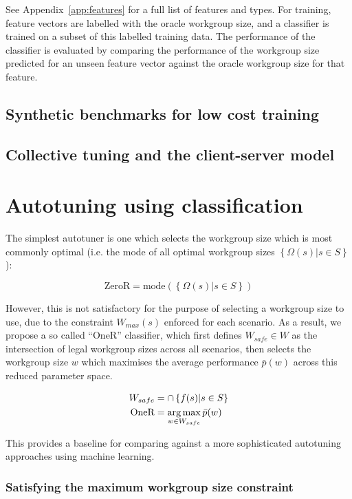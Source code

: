 See Appendix~\ref{app:features} for a full list of features and
types. For training, feature vectors are labelled with the oracle
workgroup size, and a classifier is trained on a subset of this
labelled training data. The performance of the classifier is evaluated
by comparing the performance of the workgroup size predicted for an
unseen feature vector against the oracle workgroup size for that
feature.

\subsection{Synthetic benchmarks for low cost training}

\subsection{Collective tuning and the client-server model}


\section{Autotuning using classification}

The simplest autotuner is one which selects the workgroup size which
is most commonly optimal (i.e. the mode of all optimal workgroup sizes
$\left\{ \Omega(s) | s \in S \right\}$):

\begin{equation}
\text{ZeroR} = \text{mode}( \left\{ \Omega(s) | s \in S \right\} )
\end{equation}

However, this is not satisfactory for the purpose of selecting a
workgroup size to use, due to the constraint $W_{max}(s)$ enforced for
each scenario. As a result, we propose a so called ``OneR''
classifier, which first defines $W_{safe} \in W$ as the intersection
of legal workgroup sizes across all scenarios, then selects the
workgroup size $w$ which maximises the average performance
$\bar{p}(w)$ across this reduced parameter space.

\begin{align}
W_{safe} &= \cap \left\{ f(s) | s \in S \right\} \\
\text{OneR} &= \operatorname*{arg\,max}_{w \in W_{safe}} \bar{p}(w)
\end{align}

This provides a baseline for comparing against a more sophisticated
autotuning approaches using machine learning.

\subsubsection{Satisfying the maximum workgroup size constraint}

